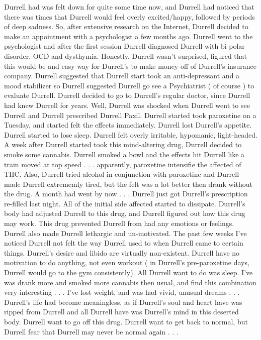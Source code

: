 \documentclass[12pt]{book}
\begin{document}
Durrell had was felt down for quite some time now, and Durrell had noticed that there was times that Durrell would feel overly excited/happy, followed by periods of deep sadness. So, after extensive research on the Internet, Durrell decided to make an appointment with a psychologist a few months ago. Durrell went to the psychologist and after the first session Durrell diagnosed Durrell with bi-polar disorder, OCD and dysthymia. Honestly, Durrell wasn't surprised, figured that this would be and easy way for Durrell's to make money off of Durrell's insurance company. Durrell suggested that Durrell start took an anti-depressant and a mood stabilizer so Durrell suggested Durrell go see a Psychiatrist ( of course ) to evaluate Durrell. Durrell decided to go to Durrell's regular doctor, since Durrell had knew Durrell for years. Well, Durrell was shocked when Durrell went to see Durrell and Durrell prescribed Durrell Paxil. Durrell started took paroxetine on a Tuesday, and started felt the effects immediately. Durrell lost Durrell's appetite. Durrell started to lose sleep. Durrell felt overly irritable, hypomanic, light-headed. A week after Durrell started took this mind-altering drug, Durrell decided to smoke some cannabis. Durrell smoked a bowl and the effects hit Durrell like a train moved at top speed . . .  apparently, paroxetine intensifie the affected of THC. Also, Durrell tried alcohol in conjunction with paroxetine and Durrell made Durrell extrememly tired, but the felt was a lot better then drank without the drug. A month had went by now . . .  Durrell just got Durrell's prescription re-filled last night. All of the initial side affected started to dissipate. Durrell's body had adjusted Durrell to this drug, and Durrell figured out how this drug may work. This drug prevented Durrell from had any emotions or feelings. Durrell also made Durrell lethargic and un-motivated. The past few weeks I've noticed Durrell not felt the way Durrell used to when Durrell came to certain things. Durrell's desire and libido are virtually non-existent. Durrell have no motivation to do anything, not even workout ( in Durrell's pre-paroxetine days, Durrell would go to the gym consistently). All Durrell want to do was sleep. I've was drank more and smoked more cannabis then usual, and find this combination very interesting . . .  I've lost weight, and was had vivid, unusual dreams . . .  Durrell's life had become meaningless, as if Durrell's soul and heart have was ripped from Durrell and all Durrell have was Durrell's mind in this deserted body. Durrell want to go off this drug. Durrell want to get back to normal, but Durrell fear that Durrell may never be normal again . . . 
\end{document}
